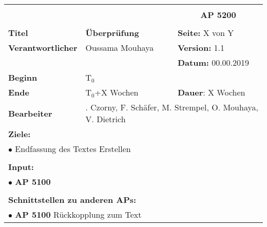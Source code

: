 \clearpage
\begin{table}[!h]
 \begin{center}
  \begin{tabular}{|p{35mm}||p{55mm}|p{50mm}||p{40mm}|}
   \hline
   \multicolumn{3}{|l||}{\textbf{}} & \multicolumn{1}{c|}{}\\
   \multicolumn{3}{|l||}{\textbf{}} & \multicolumn{1}{c|}{\textbf{AP 5200}}\\
   \multicolumn{3}{|l||}{\textbf{}} & \multicolumn{1}{c|}{}\\
   \hline\hline
   \textbf{Titel} & \multicolumn{2}{p{7cm}||}{\textbf{Überprüfung}} & \textbf{Seite:} X von Y\\
   \hline
   \textbf{Verantwortlicher} & \multicolumn{2}{l||}{Oussama Mouhaya} & \textbf{Version:} 1.1\\
   \hline
   \multicolumn{3}{|l||}{} & \textbf{Datum:} 00.00.2019\\
   \hline\hline
   \textbf{Beginn} & \multicolumn{2}{l||}{T$_0$} & \\
   \hline
   \textbf{Ende} & \multicolumn{2}{l||}{T$_0$+X Wochen} & \textbf{Dauer}: X Wochen\\
   \hline\hline
   \textbf{Bearbeiter} & \multicolumn{3}{l|}{. Czorny, F. Schäfer, M. Strempel, O. Mouhaya, V. Dietrich}\\
   \hline\hline
   \multicolumn{4}{|p{150mm}|}{\textbf{Ziele:}}\\
   \multicolumn{4}{|p{150mm}|}{$\bullet$ Endfassung des Textes Erstellen}\\
   \multicolumn{4}{|p{150mm}|}{}\\
   \multicolumn{4}{|p{150mm}|}{\textbf{Input:}}\\
   \multicolumn{4}{|p{150mm}|}{$\bullet$ \textbf{AP 5100}}\\
   \multicolumn{4}{|p{150mm}|}{}\\
   \multicolumn{4}{|p{150mm}|}{\textbf{Schnittstellen zu anderen APs:}}\\
   \multicolumn{4}{|p{150mm}|}{$\bullet$ \textbf{AP 5100} Rückkopplung zum Text}\\

\end{tabular}
\end{center}
\end{table}
